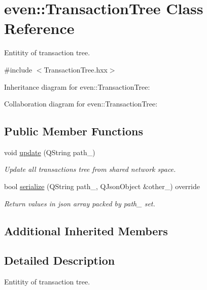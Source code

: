 \hypertarget{classeven_1_1_transaction_tree}{}\section{even\+:\+:Transaction\+Tree Class Reference}
\label{classeven_1_1_transaction_tree}


Entitity of transaction tree.  




{\ttfamily \#include $<$Transaction\+Tree.\+hxx$>$}



Inheritance diagram for even\+:\+:Transaction\+Tree\+:


Collaboration diagram for even\+:\+:Transaction\+Tree\+:
\subsection*{Public Member Functions}
\begin{DoxyCompactItemize}
\item 
\mbox{\label{classeven_1_1_transaction_tree_a30156d5a65c66f041a41e15d16350abf}} 
void \mbox{\hyperlink{classeven_1_1_transaction_tree_a30156d5a65c66f041a41e15d16350abf}{update}} (Q\+String path\+\_\+)
\begin{DoxyCompactList}\small\item\em Update all transactions tree from shared network space. \end{DoxyCompactList}\item 
\mbox{\label{classeven_1_1_transaction_tree_a199c51c9f7a0338a214aad42493334e5}} 
bool \mbox{\hyperlink{classeven_1_1_transaction_tree_a199c51c9f7a0338a214aad42493334e5}{serialize}} (Q\+String path\+\_\+, Q\+Json\+Object \&other\+\_\+) override
\begin{DoxyCompactList}\small\item\em Return values in json array packed by path\+\_\+ set. \end{DoxyCompactList}\end{DoxyCompactItemize}
\subsection*{Additional Inherited Members}


\subsection{Detailed Description}
Entitity of transaction tree. 

